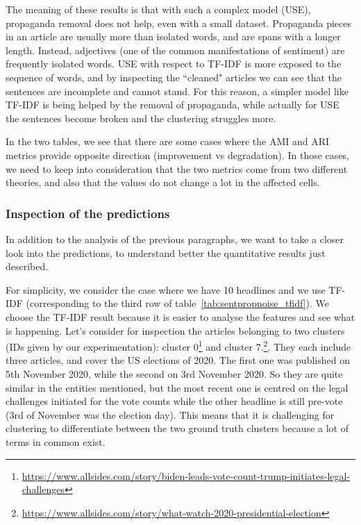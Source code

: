 The meaning of these results is that with such a complex model (USE),
propaganda removal does not help, even with a small dataset. Propaganda pieces in an article are usually more than isolated words, and are spans with a longer length. Instead, adjectives (one of the common manifestations of sentiment) are frequently isolated words. USE with respect to TF-IDF is more exposed to the sequence of words, and by inspecting the ``cleaned" articles we can see that the sentences are incomplete and cannot stand. For this reason, a simpler model like TF-IDF is being helped by the removal of propaganda, while actually for USE the sentences become broken and the clustering struggles more.

In the two tables, we see that there are some cases where the AMI and ARI metrics provide opposite direction (improvement vs degradation). In those cases, we need to keep into consideration that the two metrics come from two different theories, and also that the values do not change a lot in the affected cells.

\subsubsection{Inspection of the predictions}

In addition to the analysis of the previous paragraphs, we want to take a closer look into the predictions, to understand better the quantitative results just described.

For simplicity, we consider the case where we have 10 headlines and we use TF-IDF (corresponding to the third row of table~\ref{tab:sentpropnoise_tfidf}). We choose the TF-IDF result because it is easier to analyse the features and see what is happening.
Let’s consider for inspection the articles belonging to two clusters (IDs given by our experimentation): cluster 0\footnote{\url{https://www.allsides.com/story/biden-leads-vote-count-trump-initiates-legal-challenges}} and cluster 7.\footnote{\url{https://www.allsides.com/story/what-watch-2020-presidential-election}}. They each include three articles, and cover the US elections of 2020. The first one was published on 5th November 2020, while the second on 3rd November 2020. So they are quite similar in the entities mentioned, but the most recent one is centred on the legal challenges initiated for the vote counts while the other headline is still pre-vote (3rd of November was the election day). This means that it is challenging for clustering to differentiate between the two ground truth clusters because a lot of terms in common exist.

